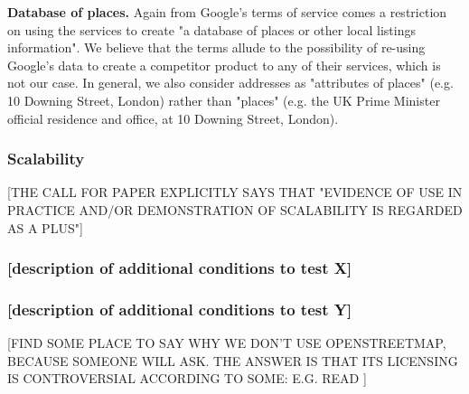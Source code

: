     \textbf{Database of places.} Again from Google's terms of service comes a restriction on using the services to create "a database of places or other local listings information". We believe that the terms allude to the possibility of re-using Google's data to create a competitor product to any of their services, which is not our case. In general, we also consider addresses as "attributes of places" (e.g. 10 Downing Street, London) rather than "places" (e.g. the UK Prime Minister official residence and office, at 10 Downing Street, London).
    	
    \subsubsection{Scalability}
    
        [THE CALL FOR PAPER EXPLICITLY SAYS THAT "EVIDENCE OF USE IN PRACTICE AND/OR DEMONSTRATION OF SCALABILITY IS REGARDED AS A PLUS"]
    
    \subsubsection{{[}description of additional conditions to test X{]}}
    \subsubsection{{[}description of additional conditions to test Y{]}}

[FIND SOME PLACE TO SAY WHY WE DON'T USE OPENSTREETMAP, BECAUSE SOMEONE WILL ASK. THE ANSWER IS THAT ITS LICENSING IS CONTROVERSIAL ACCORDING TO SOME: E.G. READ \cite{CentreforSpatialLawandPolicy:2014tx}]
    

